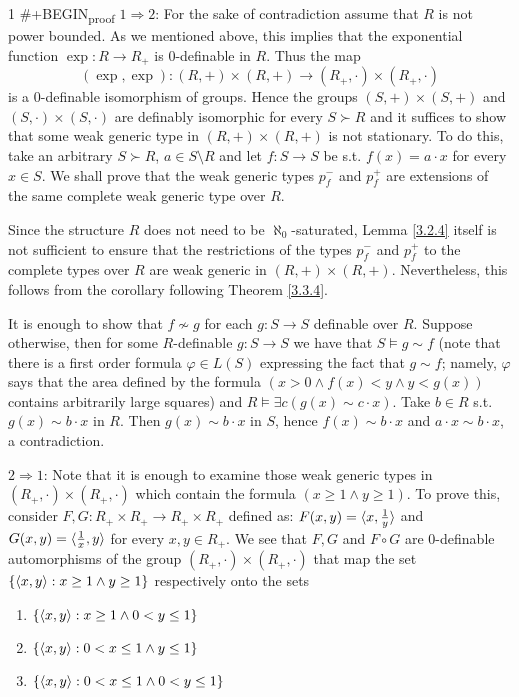 \documentclass[11pt]{article}
\begin{document}
1    \#+BEGIN\textsubscript{proof}
    \(1\Rightarrow 2\): For the sake of contradiction assume that \(R\) is not power bounded. As we mentioned
    above, this implies that the exponential function \(\exp:R\to R_+\) is 0-definable in \(R\). Thus
    the map
\begin{equation*}
(\exp,\exp):(R,+)\times(R,+)\to(R_+,\cdot)\times(R_+,\cdot)
\end{equation*}
is a 0-definable isomorphism of groups. Hence the groups \((S,+)\times(S,+)\) and \((S,\cdot)\times(S,\cdot)\) are
definably isomorphic for every \(S\succ R\) and it suffices to show that some weak generic type
in \((R,+)\times(R,+)\) is not stationary. To do this, take an arbitrary \(S\succ R\), \(a\in S\setminus R\) and
let \(f:S\to S\) be s.t. \(f(x)=a\cdot x\) for every \(x\in S\). We shall prove that the weak generic
types \(p_f^-\) and \(p_f^+\) are extensions of the same complete weak generic type over \(R\).

Since the structure \(R\) does not need to be \(\aleph_0\)-saturated, Lemma \ref{3.2.4} itself is not
sufficient to ensure that the restrictions of the types \(p_f^-\) and \(p_f^+\) to the complete
types over \(R\) are weak generic in \((R,+)\times(R,+)\). Nevertheless, this follows from the
corollary following Theorem \ref{3.3.4}.

It is enough to show that \(f\not\sim g\) for each \(g:S\to S\) definable over \(R\). Suppose
otherwise, then for some \(R\)-definable \(g:S\to S\) we have that \(S\vDash g\sim f\) (note that there is
a first order formula \(\varphi\in L(S)\) expressing the fact that \(g\sim f\); namely, \(\varphi\) says that the
area defined by the formula \((x>0\wedge f(x)<y\wedge y<g(x))\) contains arbitrarily large squares)
and \(R\vDash\exists c(g(x)\sim c\cdot x)\). Take \(b\in R\) s.t. \(g(x)\sim b\cdot x\) in \(R\). Then \(g(x)\sim b\cdot x\)
in \(S\), hence \(f(x)\sim b\cdot x\) and \(a\cdot x\sim b\cdot x\), a contradiction.

\(2\Rightarrow 1\): Note that it is enough to examine those weak generic types in \((R_+,\cdot)\times(R_+,\cdot)\) which
contain the formula \((x\ge 1\wedge y\ge 1)\). To prove this, consider \(F,G:R_+\times R_+\to R_+\times R_+\) defined
as: \(F(x,y)=\langle x,\frac{1}{y}\rangle\) and \(G(x,y)=\langle\frac{1}{x},y\rangle\) for every \(x,y\in R_+\). We see
that \(F,G\) and \(F\circ G\) are 0-definable automorphisms of the group \((R_+,\cdot)\times(R_+,\cdot)\) that map
the set \(\{\langle x,y\rangle:x\ge 1\wedge y\ge 1\}\) respectively onto the sets
\begin{enumerate}
\item \(\{\langle x,y\rangle:x\ge 1\wedge 0<y\le 1\}\)
\item \(\{\langle x,y\rangle:0<x\le 1\wedge y\le 1\}\)
\item \(\{\langle x,y\rangle:0<x\le 1\wedge 0<y\le 1\}\)
\end{enumerate}
\end{document}

